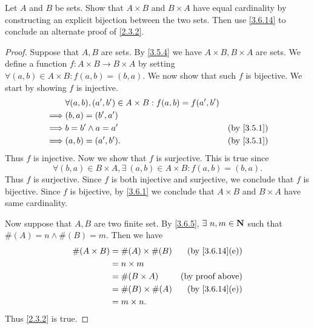 \begin{exercise}\label{ex 3.6.5}
  Let \(A\) and \(B\) be sets.
  Show that \(A \times B\) and \(B \times A\) have equal cardinality by constructing an explicit bijection between the two sets.
  Then use \cref{3.6.14} to conclude an alternate proof of \cref{2.3.2}.
\end{exercise}

\begin{proof}
  Suppose that \(A, B\) are sets.
  By \cref{3.5.4} we have \(A \times B, B \times A\) are sets.
  We define a function \(f : A \times B \to B \times A\) by setting \(\forall (a, b) \in A \times B : f(a, b) = (b, a)\).
  We now show that such \(f\) is bijective.
  We start by showing \(f\) is injective.
  \begin{align*}
             & \forall (a, b), (a', b') \in A \times B : f(a, b) = f(a', b')                            \\
    \implies & (b, a) = (b', a')                                                                        \\
    \implies & b = b' \land a = a'                                           & \text{(by \cref{3.5.1})} \\
    \implies & (a, b) = (a', b').                                            & \text{(by \cref{3.5.1})}
  \end{align*}
  Thus \(f\) is injective.
  Now we show that \(f\) is surjective.
  This is true since
  \[
    \forall (b, a) \in B \times A, \exists\ (a, b) \in A \times B : f(a, b) = (b, a).
  \]
  Thus \(f\) is surjective.
  Since \(f\) is both injective and surjective, we conclude that \(f\) is bijective.
  Since \(f\) is bijective, by \cref{3.6.1} we conclude that \(A \times B\) and \(B \times A\) have same cardinality.

  Now suppose that \(A, B\) are two finite set.
  By \cref{3.6.5}, \(\exists\ n, m \in \N\) such that \(\#(A) = n \land \#(B) = m\).
  Then we have
  \begin{align*}
    \#(A \times B) & = \#(A) \times \#(B) & \text{(by \cref{3.6.14}(e))} \\
                   & = n \times m                                        \\
                   & = \#(B \times A)     & \text{(by proof above)}      \\
                   & = \#(B) \times \#(A) & \text{(by \cref{3.6.14}(e))} \\
                   & = m \times n.
  \end{align*}
  Thus \cref{2.3.2} is true.
\end{proof}


